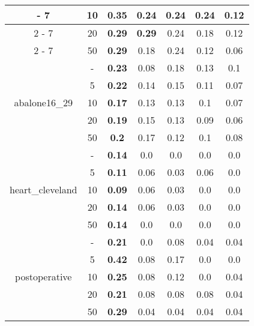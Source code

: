 \documentclass{article}%
\begin{document}
\begin{longtable}{c|c|ccccc}
{-%
7}%
&10&\textbf{0.35}&0.24&0.24&0.24&0.12\\%
\cline{2%
-%
7}%
&20&\textbf{0.29}&\textbf{0.29}&0.24&0.18&0.12\\%
\cline{2%
-%
7}%
&50&\textbf{0.29}&0.18&0.24&0.12&0.06\\%
\hline%
\multirow{5}{*}{abalone16\_29}&{-}&\textbf{0.23}&0.08&0.18&0.13&0.1\\%
\cline{2%
-%
7}%
&5&\textbf{0.22}&0.14&0.15&0.11&0.07\\%
\cline{2%
-%
7}%
&10&\textbf{0.17}&0.13&0.13&0.1&0.07\\%
\cline{2%
-%
7}%
&20&\textbf{0.19}&0.15&0.13&0.09&0.06\\%
\cline{2%
-%
7}%
&50&\textbf{0.2}&0.17&0.12&0.1&0.08\\%
\hline%
\multirow{5}{*}{heart\_cleveland}&{-}&\textbf{0.14}&0.0&0.0&0.0&0.0\\%
\cline{2%
-%
7}%
&5&\textbf{0.11}&0.06&0.03&0.06&0.0\\%
\cline{2%
-%
7}%
&10&\textbf{0.09}&0.06&0.03&0.0&0.0\\%
\cline{2%
-%
7}%
&20&\textbf{0.14}&0.06&0.03&0.0&0.0\\%
\cline{2%
-%
7}%
&50&\textbf{0.14}&0.0&0.0&0.0&0.0\\%
\hline%
\multirow{5}{*}{postoperative}&{-}&\textbf{0.21}&0.0&0.08&0.04&0.04\\%
\cline{2%
-%
7}%
&5&\textbf{0.42}&0.08&0.17&0.0&0.0\\%
\cline{2%
-%
7}%
&10&\textbf{0.25}&0.08&0.12&0.0&0.04\\%
\cline{2%
-%
7}%
&20&\textbf{0.21}&0.08&0.08&0.08&0.04\\%
\cline{2%
-%
7}%
&50&\textbf{0.29}&0.04&0.04&0.04&0.04\\%
\hline%
\end{longtable}

%
\end{document}
